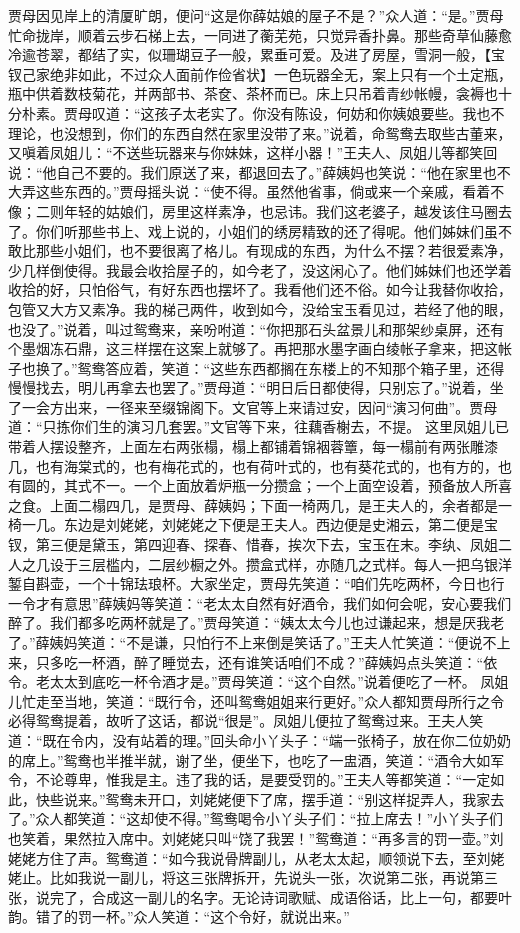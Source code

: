 \documentclass[12pt,oneside]{book}
\begin{document}
贾母因见岸上的清厦旷朗，便问“这是你薛姑娘的屋子不是？”众人道：“是。”贾母忙命拢岸，顺着云步石梯上去，一同进了蘅芜苑，只觉异香扑鼻。那些奇草仙藤愈冷逾苍翠，都结了实，似珊瑚豆子一般，累垂可爱。及进了房屋，雪洞一般，【宝钗己家绝非如此，不过众人面前作俭省状】一色玩器全无，案上只有一个土定瓶，瓶中供着数枝菊花，并两部书、茶奁、茶杯而已。床上只吊着青纱帐幔，衾褥也十分朴素。贾母叹道：“这孩子太老实了。你没有陈设，何妨和你姨娘要些。我也不理论，也没想到，你们的东西自然在家里没带了来。”说着，命鸳鸯去取些古董来，又嗔着凤姐儿：“不送些玩器来与你妹妹，这样小器！”王夫人、凤姐儿等都笑回说：“他自己不要的。我们原送了来，都退回去了。”薛姨妈也笑说：“他在家里也不大弄这些东西的。”贾母摇头说：“使不得。虽然他省事，倘或来一个亲戚，看着不像；二则年轻的姑娘们，房里这样素净，也忌讳。我们这老婆子，越发该住马圈去了。你们听那些书上、戏上说的，小姐们的绣房精致的还了得呢。他们姊妹们虽不敢比那些小姐们，也不要很离了格儿。有现成的东西，为什么不摆？若很爱素净，少几样倒使得。我最会收拾屋子的，如今老了，没这闲心了。他们姊妹们也还学着收拾的好，只怕俗气，有好东西也摆坏了。我看他们还不俗。如今让我替你收拾，包管又大方又素净。我的梯己两件，收到如今，没给宝玉看见过，若经了他的眼，也没了。”说着，叫过鸳鸯来，亲吩咐道：“你把那石头盆景儿和那架纱桌屏，还有个墨烟冻石鼎，这三样摆在这案上就够了。再把那水墨字画白绫帐子拿来，把这帐子也换了。”鸳鸯答应着，笑道：“这些东西都搁在东楼上的不知那个箱子里，还得慢慢找去，明儿再拿去也罢了。”贾母道：“明日后日都使得，只别忘了。”说着，坐了一会方出来，一径来至缀锦阁下。文官等上来请过安，因问“演习何曲”。贾母道：“只拣你们生的演习几套罢。”文官等下来，往藕香榭去，不提。
这里凤姐儿已带着人摆设整齐，上面左右两张榻，榻上都铺着锦裀蓉簟，每一榻前有两张雕漆几，也有海棠式的，也有梅花式的，也有荷叶式的，也有葵花式的，也有方的，也有圆的，其式不一。一个上面放着炉瓶一分攒盒；一个上面空设着，预备放人所喜之食。上面二榻四几，是贾母、薛姨妈；下面一椅两几，是王夫人的，余者都是一椅一几。东边是刘姥姥，刘姥姥之下便是王夫人。西边便是史湘云，第二便是宝钗，第三便是黛玉，第四迎春、探春、惜春，挨次下去，宝玉在末。李纨、凤姐二人之几设于三层槛内，二层纱橱之外。攒盒式样，亦随几之式样。每人一把乌银洋錾自斟壶，一个十锦珐琅杯。大家坐定，贾母先笑道：“咱们先吃两杯，今日也行一令才有意思”薛姨妈等笑道：“老太太自然有好酒令，我们如何会呢，安心要我们醉了。我们都多吃两杯就是了。”贾母笑道：“姨太太今儿也过谦起来，想是厌我老了。”薛姨妈笑道：“不是谦，只怕行不上来倒是笑话了。”王夫人忙笑道：“便说不上来，只多吃一杯酒，醉了睡觉去，还有谁笑话咱们不成？”薛姨妈点头笑道：“依令。老太太到底吃一杯令酒才是。”贾母笑道：“这个自然。”说着便吃了一杯。
凤姐儿忙走至当地，笑道：“既行令，还叫鸳鸯姐姐来行更好。”众人都知贾母所行之令必得鸳鸯提着，故听了这话，都说“很是”。凤姐儿便拉了鸳鸯过来。王夫人笑道：“既在令内，没有站着的理。”回头命小丫头子：“端一张椅子，放在你二位奶奶的席上。”鸳鸯也半推半就，谢了坐，便坐下，也吃了一盅酒，笑道：“酒令大如军令，不论尊卑，惟我是主。违了我的话，是要受罚的。”王夫人等都笑道：“一定如此，快些说来。”鸳鸯未开口，刘姥姥便下了席，摆手道：“别这样捉弄人，我家去了。”众人都笑道：“这却使不得。”鸳鸯喝令小丫头子们：“拉上席去！”小丫头子们也笑着，果然拉入席中。刘姥姥只叫“饶了我罢！”鸳鸯道：“再多言的罚一壶。”刘姥姥方住了声。鸳鸯道：“如今我说骨牌副儿，从老太太起，顺领说下去，至刘姥姥止。比如我说一副儿，将这三张牌拆开，先说头一张，次说第二张，再说第三张，说完了，合成这一副儿的名字。无论诗词歌赋、成语俗话，比上一句，都要叶韵。错了的罚一杯。”众人笑道：“这个令好，就说出来。”
\end{document}
